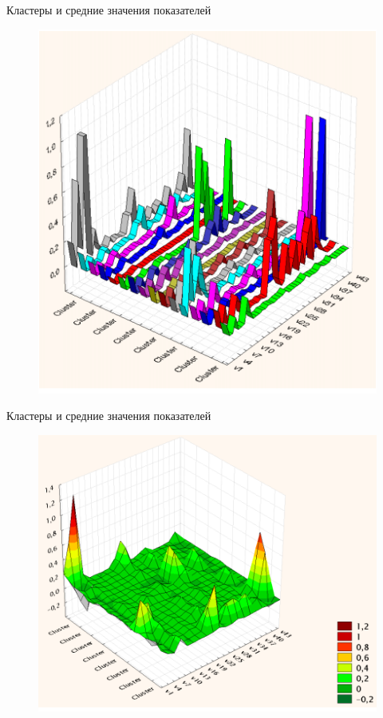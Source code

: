 \documentclass{beamer}
\begin{document}
\begin{frame}
Кластеры и средние значения показателей
\begin{figure}[h]
\centering
\includegraphics[scale=0.5]{images/lec07-pic44.png}
\end{figure}
\end{frame}

\begin{frame}
Кластеры и средние значения показателей
\begin{figure}[h]
\centering
\includegraphics[scale=0.5]{images/lec07-pic45.png}
\end{figure}
\end{frame}
\end{document}

